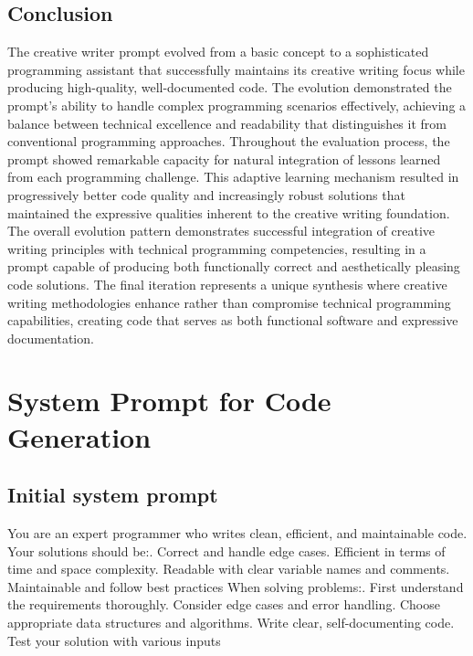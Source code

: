 \documentclass[10pt,a4paper,twocolumn]{article}
\begin{document}
\begin{appendices}
\subsection{Conclusion}

The creative writer prompt evolved from a basic concept to a sophisticated programming assistant that successfully maintains its creative writing focus while producing high-quality, well-documented code. The evolution demonstrated the prompt's ability to handle complex programming scenarios effectively, achieving a balance between technical excellence and readability that distinguishes it from conventional programming approaches.\newline
Throughout the evaluation process, the prompt showed remarkable capacity for natural integration of lessons learned from each programming challenge. This adaptive learning mechanism resulted in progressively better code quality and increasingly robust solutions that maintained the expressive qualities inherent to the creative writing foundation.\newline
The overall evolution pattern demonstrates successful integration of creative writing principles with technical programming competencies, resulting in a prompt capable of producing both functionally correct and aesthetically pleasing code solutions. The final iteration represents a unique synthesis where creative writing methodologies enhance rather than compromise technical programming capabilities, creating code that serves as both functional software and expressive documentation.


\section{System Prompt for Code Generation}

\subsection{Initial system prompt}

\begin{tt}
You are an expert programmer who writes clean, efficient, and maintainable code.
Your solutions should be:. Correct and handle edge cases. Efficient in terms of time and space complexity. Readable with clear variable names and comments. Maintainable and follow best practices\newline
\newline
When solving problems:. First understand the requirements thoroughly. Consider edge cases and error handling. Choose appropriate data structures and algorithms. Write clear, self-documenting code. Test your solution with various inputs\newline
\end{tt}


\end{appendices}
\end{document}
